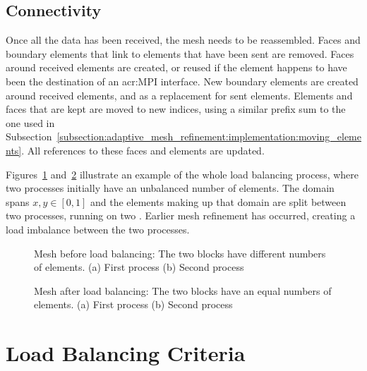 \subsection{Connectivity}\label{subsection:load_balancing:reconstruction:connectivity}

Once all the data has been received, the mesh needs to be reassembled. Faces and boundary elements
that link to elements that have been sent are removed. Faces around received elements are created,
or reused if the element happens to have been the destination of an \acrshort{acr:MPI} interface.
New boundary elements are created around received elements, and as a replacement for sent elements.
Elements and faces that are kept are moved to new indices, using a similar prefix sum to the one
used in Subsection~\ref{subsection:adaptive_mesh_refinement:implementation:moving_elements}. All
references to these faces and elements are updated.

Figures~\ref{fig:lb_before} and~\ref{fig:lb_after} illustrate an example of the whole load balancing
process, where two processes initially have an unbalanced number of elements. The domain spans \(x,
y \in [0, 1]\) and the elements making up that domain are split between two processes, running on
two . Earlier mesh refinement has occurred, creating a load imbalance between
the two processes.

\begin{figure}[H]
	\centering
	\subfloat[Process 0]
	{\label{fig:lb_before_0}}
	\hfill
	\subfloat[Process 1]
	{\label{fig:lb_before_1}}
	\caption{Mesh before load balancing: The two blocks have different numbers of elements. (a) First process (b) Second process}\label{fig:lb_before}
\end{figure}

\begin{figure}[H]
	\centering
	\subfloat[Process 0]
	{\label{fig:lb_after_0}}
	\hfill
	\subfloat[Process 1]
	{\label{fig:lb_after_1}}
	\caption{Mesh after load balancing: The two blocks have an equal numbers of elements. (a) First process (b) Second process}\label{fig:lb_after}
\end{figure}

\section{Load Balancing Criteria}\label{section:load_balancing:criteria}

